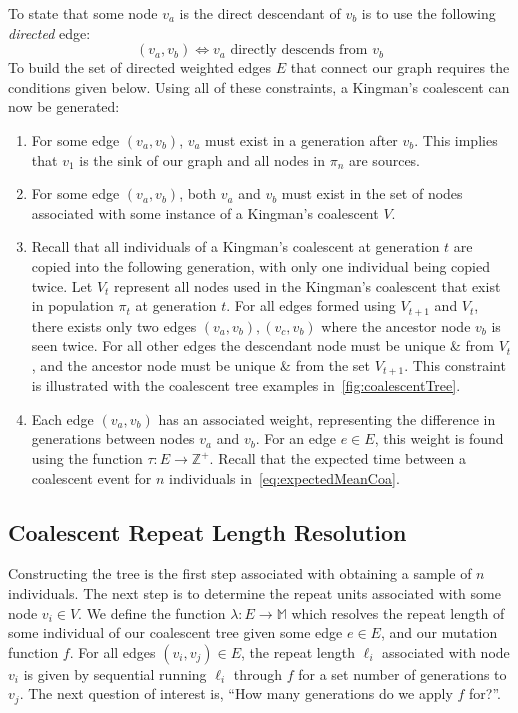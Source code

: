 To state that some node $v_a$ is the direct descendant of $v_b$ is to use the following \emph{directed} edge:
\begin{equation}
    (v_a, v_b) \Leftrightarrow v_a \text{ directly descends from } v_b
\end{equation}
To build the set of directed weighted edges $E$ that connect our graph requires the conditions given below.
Using all of these constraints, a Kingman's coalescent can now be generated:
\begin{enumerate}
    \item For some edge $(v_a, v_b)$, $v_a$ must exist in a generation after $v_b$.
        This implies that $v_1$ is the sink of our graph and all nodes in $\pi_n$ are sources.
    \item For some edge $(v_a, v_b)$, both $v_a$ and $v_b$ must exist in the set of nodes associated with some instance
        of a Kingman's coalescent $V$.
    \item Recall that all individuals of a Kingman's coalescent at generation $t$ are copied into the following
        generation, with only one individual being copied twice.
        Let $V_t$ represent all nodes used in the Kingman's coalescent that exist in population $\pi_t$ at generation
        $t$.
        For all edges formed using $V_{t+1}$ and $V_{t}$, there exists only two edges $(v_a, v_b), (v_c, v_b)$ where
        the ancestor node $v_b$ is seen twice.
        For all other edges the descendant node must be unique \& from $V_t$, and the ancestor node must be unique \&
        from the set $V_{t+1}$.
        This constraint is illustrated with the coalescent tree examples in~\autoref{fig:coalescentTree}.
    \item Each edge $(v_a, v_b)$ has an associated weight, representing the difference in generations between nodes
        $v_a$ and $v_b$.
        For an edge $e \in E$, this weight is found using the function $\tau : E \rightarrow \mathbb{Z}^+$.
        Recall that the expected time between a coalescent event for $n$ individuals in~\autoref{eq:expectedMeanCoa}.

\end{enumerate}

\subsection{Coalescent Repeat Length Resolution}\label{subsec:coalescentRepeatLengthResolution}
Constructing the tree is the first step associated with obtaining a sample of $n$ individuals.
The next step is to determine the repeat units associated with some node $v_i \in V$.
We define the function $\lambda : E \rightarrow \mathbb{M}$ which resolves the repeat length of some
individual of our coalescent tree given some edge $e \in E$, and our mutation function $f$.
For all edges $(v_i, v_j) \in E$, the repeat length $\ell_i$ associated with node $v_i$ is given by sequential running
$\ell_i$ through $f$ for a set number of generations to $v_j$.
The next question of interest is, ``How many generations do we apply $f$ for?''.

